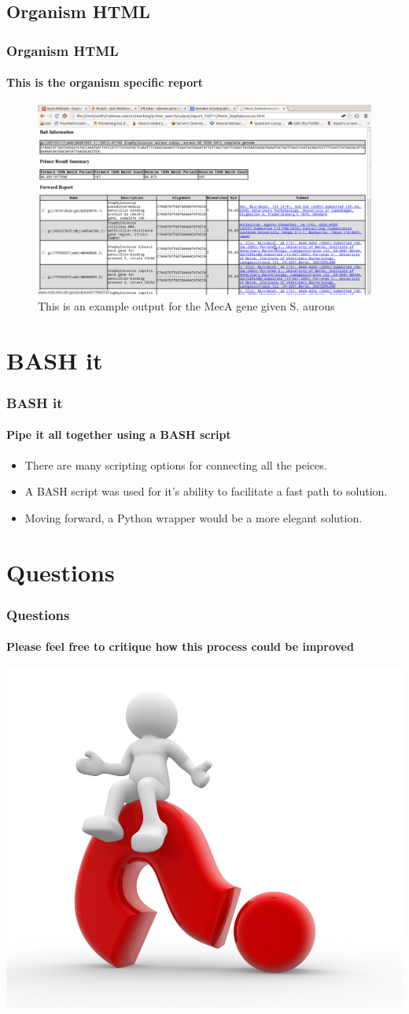 \documentclass{beamer}
\newcommand{\sectiontitle}{}
\newcommand{\newsection}[1]{\renewcommand{\sectiontitle}{#1}\section{#1}}
\newcommand{\subsectiontitle}{}
\newcommand{\newsubsection}[1]{\renewcommand{\subsectiontitle}{#1}\subsection{#1}}
\begin{document}
  \newsubsection{Organism HTML}
  \begin{frame}
    \frametitle{Organism HTML}
    \framesubtitle{This is the organism specific report}
    \begin{figure}[htp]
	\centering
	\includegraphics[width=1\textwidth]{meca_details}
	\caption{This is an example output for the MecA gene given S. aurous }\label{fig:meca_details}
	\end{figure}
  \end{frame}
  
  \newsection{BASH it}
  \begin{frame}
    \frametitle{BASH it}
    \framesubtitle{Pipe it all together using a BASH script}
    
    \begin{itemize} \itemsep1em
      \item There are many scripting options for connecting all the peices.
      \item A BASH script was used for it's ability to facilitate a fast path to solution.
      \item Moving forward, a Python wrapper would be a more elegant solution.
    \end{itemize}
    
  \end{frame}
  
  \newsection{Questions}
  \begin{frame} 
    \frametitle{Questions}
    \framesubtitle{Please feel free to critique how this process could be improved}
    
    \includegraphics[width=1\textwidth]{ask-question}
  \end{frame}
\end{document}
